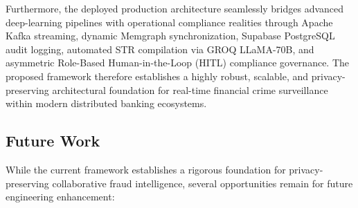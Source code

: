 \documentclass[conference]{IEEEtran}
\begin{document}
Furthermore, the deployed production architecture seamlessly bridges advanced deep-learning pipelines with operational compliance realities through Apache Kafka streaming, dynamic Memgraph synchronization, Supabase PostgreSQL audit logging, automated STR compilation via GROQ LLaMA-70B, and asymmetric Role-Based Human-in-the-Loop (HITL) compliance governance. The proposed framework therefore establishes a highly robust, scalable, and privacy-preserving architectural foundation for real-time financial crime surveillance within modern distributed banking ecosystems.

\subsection*{\textbf{Future Work}}

While the current framework establishes a rigorous foundation for privacy-preserving collaborative fraud intelligence, several opportunities remain for future engineering enhancement:
\end{document}
